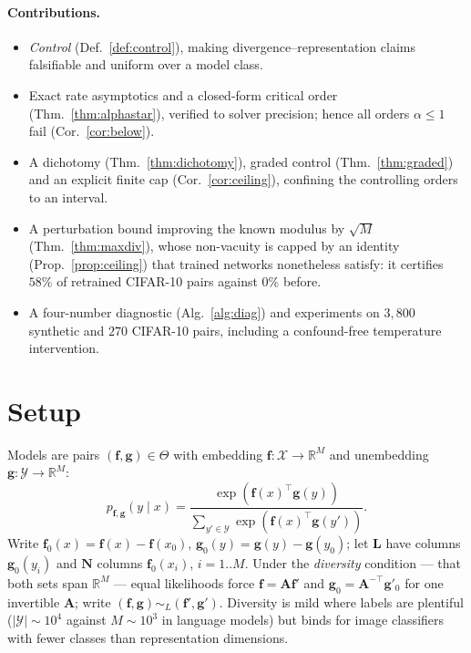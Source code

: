 \documentclass[10pt,letterpaper,twocolumn]{article}
\newcommand{\X}{\mathcal{X}}
\newcommand{\Y}{\mathcal{Y}}
\newcommand{\bff}{\mathbf{f}}
\newcommand{\bfg}{\mathbf{g}}
\newcommand{\bfL}{\mathbf{L}}
\newcommand{\bfN}{\mathbf{N}}
\newcommand{\simL}{\sim_{L}}
\theoremstyle{plain}
\theoremstyle{definition}
\theoremstyle{remark}
\begin{document}
\paragraph{Contributions.}
\begin{itemize}[leftmargin=1.2em,itemsep=1pt,topsep=2pt]
\item \emph{Control} (Def.~\ref{def:control}), making divergence--representation
      claims falsifiable and uniform over a model class.
\item Exact rate asymptotics and a closed-form critical order
      (Thm.~\ref{thm:alphastar}), verified to solver precision; hence all
      orders $\alpha\le1$ fail (Cor.~\ref{cor:below}).
\item A dichotomy (Thm.~\ref{thm:dichotomy}), graded control
      (Thm.~\ref{thm:graded}) and an explicit finite cap
      (Cor.~\ref{cor:ceiling}), confining the controlling orders to an interval.
\item A perturbation bound improving the known modulus by $\sqrt{M}$
      (Thm.~\ref{thm:maxdiv}), whose non-vacuity is capped by an identity
      (Prop.~\ref{prop:ceiling}) that trained networks nonetheless satisfy: it
      certifies $58\%$ of retrained CIFAR-10 pairs against $0\%$ before.
\item A four-number diagnostic (Alg.~\ref{alg:diag}) and experiments on
      $3{,}800$ synthetic and $270$ CIFAR-10 pairs, including a confound-free
      temperature intervention.
\end{itemize}

\section{Setup}
\label{sec:setup}

Models are pairs $(\bff,\bfg)\in\Theta$ with embedding
$\bff:\X\to\mathbb{R}^{M}$ and unembedding $\bfg:\Y\to\mathbb{R}^{M}$:
\begin{equation}
p_{\bff,\bfg}(y\mid x)=\frac{\exp(\bff(x)^{\top}\bfg(y))}
{\sum_{y'\in\Y}\exp(\bff(x)^{\top}\bfg(y'))}.
\label{eq:model}
\end{equation}
Write $\bff_{0}(x)=\bff(x)-\bff(x_{0})$, $\bfg_{0}(y)=\bfg(y)-\bfg(y_{0})$; let
$\bfL$ have columns $\bfg_{0}(y_{i})$ and $\bfN$ columns $\bff_{0}(x_{i})$,
$i=1..M$. Under the \emph{diversity} condition --- that both sets span
$\mathbb{R}^{M}$ --- equal likelihoods force $\bff=\mathbf{A}\bff'$ and
$\bfg_{0}=\mathbf{A}^{-\top}\bfg'_{0}$ for one invertible $\mathbf{A}$; write
$(\bff,\bfg)\simL(\bff',\bfg')$. Diversity is mild where labels are plentiful
($|\Y|\sim10^{4}$ against $M\sim10^{3}$ in language models) but binds for image
classifiers with fewer classes than representation dimensions.
\end{document}
